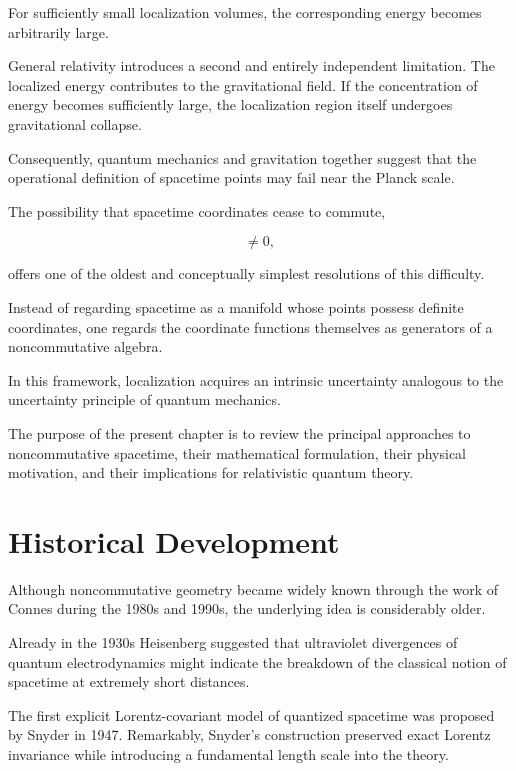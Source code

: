 For sufficiently small localization volumes, the corresponding energy becomes
arbitrarily large.

General relativity introduces a second and entirely independent limitation.
The localized energy contributes to the gravitational field. If the
concentration of energy becomes sufficiently large, the localization region
itself undergoes gravitational collapse.

Consequently, quantum mechanics and gravitation together suggest that the
operational definition of spacetime points may fail near the Planck scale.

The possibility that spacetime coordinates cease to commute,

\begin{equation}
[x^\mu,x^\nu]\neq0,
\label{eq:NCcomm}
\end{equation}

offers one of the oldest and conceptually simplest resolutions of this
difficulty.

Instead of regarding spacetime as a manifold whose points possess definite
coordinates, one regards the coordinate functions themselves as generators of
a noncommutative algebra.

In this framework, localization acquires an intrinsic uncertainty analogous to
the uncertainty principle of quantum mechanics.

The purpose of the present chapter is to review the principal approaches to
noncommutative spacetime, their mathematical formulation, their physical
motivation, and their implications for relativistic quantum theory.

\section{Historical Development}

Although noncommutative geometry became widely known through the work of
Connes during the 1980s and 1990s, the underlying idea is considerably older.

Already in the 1930s Heisenberg suggested that ultraviolet divergences of
quantum electrodynamics might indicate the breakdown of the classical notion
of spacetime at extremely short distances.

The first explicit Lorentz-covariant model of quantized spacetime was proposed
by Snyder in 1947. Remarkably, Snyder's construction preserved exact Lorentz
invariance while introducing a fundamental length scale into the theory.

